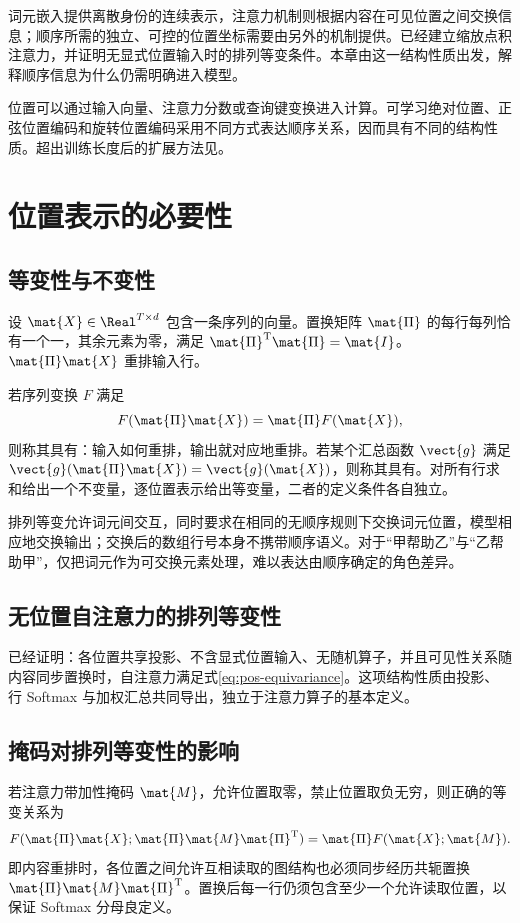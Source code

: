 \documentclass[../textbook.tex]{subfiles}
\begin{document}
\fi
{}

词元嵌入提供离散身份的连续表示，注意力机制则根据内容在可见位置之间交换信息；顺序所需的独立、可控的位置坐标需要由另外的机制提供。已经建立缩放点积注意力，并证明无显式位置输入时的排列等变条件。本章由这一结构性质出发，解释顺序信息为什么仍需明确进入模型。

位置可以通过输入向量、注意力分数或查询键变换进入计算。可学习绝对位置、正弦位置编码和旋转位置编码采用不同方式表达顺序关系，因而具有不同的结构性质。超出训练长度后的扩展方法见。

\section{位置表示的必要性}

\subsection{等变性与不变性}
设 $\mat{X}\in\Real^{T\times d}$ 包含一条序列的向量。置换矩阵 $\mat{\Pi}$ 的每行每列恰有一个一，其余元素为零，满足 $\mat{\Pi}^{\mathrm{T}}\mat{\Pi}=\mat{I}$。$\mat{\Pi} \mat{X}$ 重排输入行。

若序列变换 $F$ 满足
\begin{equation}
 F(\mat{\Pi} \mat{X})=\mat{\Pi} F(\mat{X}),
 \label{eq:pos-equivariance}
\end{equation}
则称其具有：输入如何重排，输出就对应地重排。若某个汇总函数 $\vect{g}$ 满足 $\vect{g}(\mat{\Pi} \mat{X})=\vect{g}(\mat{X})$，则称其具有。对所有行求和给出一个不变量，逐位置表示给出等变量，二者的定义条件各自独立。

排列等变允许词元间交互，同时要求在相同的无顺序规则下交换词元位置，模型相应地交换输出；交换后的数组行号本身不携带顺序语义。对于“甲帮助乙”与“乙帮助甲”，仅把词元作为可交换元素处理，难以表达由顺序确定的角色差异。

\subsection{无位置自注意力的排列等变性}
已经证明：各位置共享投影、不含显式位置输入、无随机算子，并且可见性关系随内容同步置换时，自注意力满足式\eqref{eq:pos-equivariance}。这项结构性质由投影、行 Softmax 与加权汇总共同导出，独立于注意力算子的基本定义。

\subsection{掩码对排列等变性的影响}
若注意力带加性掩码 $\mat{M}$，允许位置取零，禁止位置取负无穷，则正确的等变关系为
\begin{equation}
 F(\mat{\Pi} \mat{X};\mat{\Pi} \mat{M}\mat{\Pi}^{\mathrm{T}})=\mat{\Pi} F(\mat{X};\mat{M}).
\end{equation}
即内容重排时，各位置之间允许互相读取的图结构也必须同步经历共轭置换 $\mat{\Pi}\mat{M}\mat{\Pi}^{\mathrm{T}}$。置换后每一行仍须包含至少一个允许读取位置，以保证 Softmax 分母良定义。
\end{document}
